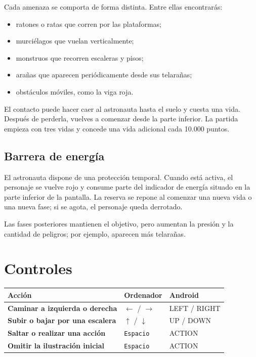 \documentclass[11pt,a4paper]{article}
\newcommand{\tecla}[1]{%
  \begingroup
  \setlength{\fboxsep}{3pt}%
  \colorbox{softgray}{\texttt{#1}}%
  \endgroup
}
\begin{document}
Cada amenaza se comporta de forma distinta. Entre ellas encontrarás:

\begin{itemize}
  \item ratones o ratas que corren por las plataformas;
  \item murciélagos que vuelan verticalmente;
  \item monstruos que recorren escaleras y pisos;
  \item arañas que aparecen periódicamente desde sus telarañas;
  \item obstáculos móviles, como la viga roja.
\end{itemize}

El contacto puede hacer caer al astronauta hasta el suelo y cuesta una vida.
Después de perderla, vuelves a comenzar desde la parte inferior. La partida
empieza con tres vidas y concede una vida adicional cada 10.000 puntos.

\subsection{Barrera de energía}

El astronauta dispone de una protección temporal. Cuando está activa, el
personaje se vuelve rojo y consume parte del indicador de energía situado en
la parte inferior de la pantalla. La reserva se repone al comenzar una nueva
vida o una nueva fase; si se agota, el personaje queda derrotado.

Las fases posteriores mantienen el objetivo, pero aumentan la presión y la
cantidad de peligros; por ejemplo, aparecen más telarañas.

\section{Controles}

\begin{center}
\begin{tabularx}{\textwidth}{>{\bfseries}p{}XX}
\toprule
Acción & Ordenador & Android \\
\midrule
Caminar a izquierda o derecha & \tecla{$\leftarrow$} / \tecla{$\rightarrow$} & LEFT / RIGHT \\
Subir o bajar por una escalera & \tecla{$\uparrow$} / \tecla{$\downarrow$} & UP / DOWN \\
Saltar o realizar una acción & \tecla{Espacio} & ACTION \\
Omitir la ilustración inicial & \tecla{Espacio} & ACTION \\
\bottomrule
\end{tabularx}
\end{center}
\end{document}
